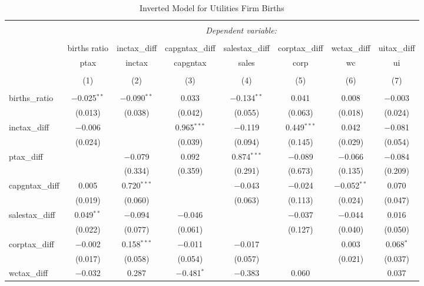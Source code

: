 
\begin{table}[!htbp] \centering 
  \caption{Inverted Model for  Utilities Firm Births} 
  \label{22rd} 
\footnotesize 
\begin{tabular}{@{\extracolsep{5pt}}lccccccc} 
\\[-1.8ex]\hline 
\hline \\[-1.8ex] 
 & \multicolumn{7}{c}{\textit{Dependent variable:}} \\ 
\cline{2-8} 
\\[-1.8ex] & births ratio & inctax\_diff & capgntax\_diff & salestax\_diff & corptax\_diff & wctax\_diff & uitax\_diff \\ 
 & ptax & inctax & capgntax & sales & corp & wc & ui \\ 
\\[-1.8ex] & (1) & (2) & (3) & (4) & (5) & (6) & (7)\\ 
\hline \\[-1.8ex] 
 births\_ratio & $-$0.025$^{**}$ & $-$0.090$^{**}$ & 0.033 & $-$0.134$^{**}$ & 0.041 & 0.008 & $-$0.003 \\ 
  & (0.013) & (0.038) & (0.042) & (0.055) & (0.063) & (0.018) & (0.024) \\ 
  inctax\_diff & $-$0.006 &  & 0.965$^{***}$ & $-$0.119 & 0.449$^{***}$ & 0.042 & $-$0.081 \\ 
  & (0.024) &  & (0.039) & (0.094) & (0.145) & (0.029) & (0.054) \\ 
  ptax\_diff &  & $-$0.079 & 0.092 & 0.874$^{***}$ & $-$0.089 & $-$0.066 & $-$0.084 \\ 
  &  & (0.334) & (0.359) & (0.291) & (0.673) & (0.135) & (0.209) \\ 
  capgntax\_diff & 0.005 & 0.720$^{***}$ &  & $-$0.043 & $-$0.024 & $-$0.052$^{**}$ & 0.070 \\ 
  & (0.019) & (0.060) &  & (0.063) & (0.113) & (0.024) & (0.047) \\ 
  salestax\_diff & 0.049$^{**}$ & $-$0.094 & $-$0.046 &  & $-$0.037 & $-$0.044 & 0.016 \\ 
  & (0.022) & (0.077) & (0.061) &  & (0.127) & (0.040) & (0.050) \\ 
  corptax\_diff & $-$0.002 & 0.158$^{***}$ & $-$0.011 & $-$0.017 &  & 0.003 & 0.068$^{*}$ \\ 
  & (0.017) & (0.058) & (0.054) & (0.057) &  & (0.021) & (0.037) \\ 
  wctax\_diff & $-$0.032 & 0.287 & $-$0.481$^{*}$ & $-$0.383 & 0.060 &  & 0.037 \\ 

\end{tabular}
\end{table}
